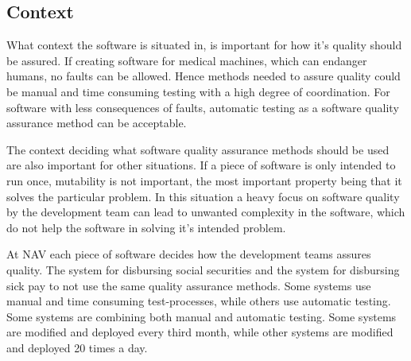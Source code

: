 
\subsection{Context}
What context the software is situated in, is important for how it's quality should be assured. If creating software for medical machines, which can endanger humans, no faults can be allowed. Hence methods needed to assure quality could be manual and time consuming testing with a high degree of coordination. For software with less consequences of faults, automatic testing as a software quality assurance method can be acceptable.

The context deciding what software quality assurance methods should be used are also important for other situations. If a piece of software is only intended to run once, mutability is not important, the most important property being that it solves the particular problem. In this situation a heavy focus on software quality by the development team can lead to unwanted complexity in the software, which do not help the software in solving it's intended problem.

At NAV each piece of software decides how the development teams assures quality. The system for disbursing social securities and the system for disbursing sick pay to not use the same quality assurance methods. Some systems use manual and time consuming test-processes, while others use automatic testing. Some systems are combining both manual and automatic testing. Some systems are modified and deployed every third month, while other systems are modified and deployed 20 times a day.


